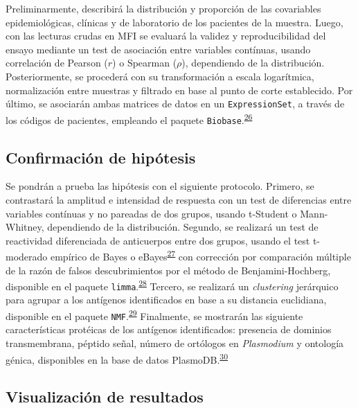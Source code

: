 \documentclass[]{article}
\begin{document}
Preliminarmente, describirá la distribución y proporción de las
covariables epidemiológicas, clínicas y de laboratorio de los pacientes
de la muestra. Luego, con las lecturas crudas en MFI se evaluará la
validez y reproducibilidad del ensayo mediante un test de asociación
entre variables contínuas, usando correlación de Pearson (\(r\)) o
Spearman (\(\rho\)), dependiendo de la distribución. Posteriormente, se
procederá con su transformación a escala logarítmica, normalización
entre muestras y filtrado en base al punto de corte establecido. Por
último, se asociarán ambas matrices de datos en un
\texttt{ExpressionSet}, a través de los códigos de pacientes, empleando
el paquete
\texttt{Biobase}.\textsuperscript{\protect\hyperlink{ref-Biobase}{26}}

\subsection{Confirmación de hipótesis}\label{confirmacion-de-hipotesis}

Se pondrán a prueba las hipótesis con el siguiente protocolo. Primero,
se contrastará la amplitud e intensidad de respuesta con un test de
diferencias entre variables contínuas y no pareadas de dos grupos,
usando t-Student o Mann-Whitney, dependiendo de la distribución.
Segundo, se realizará un test de reactividad diferenciada de anticuerpos
entre dos grupos, usando el test t-moderado empírico de Bayes o
eBayes\textsuperscript{\protect\hyperlink{ref-smyth2004ebayes}{27}} con
corrección por comparación múltiple de la razón de falsos
descubrimientos por el método de Benjamini-Hochberg, disponible en el
paquete
\texttt{limma}.\textsuperscript{\protect\hyperlink{ref-limma}{28}}
Tercero, se realizará un \emph{clustering} jerárquico para agrupar a los
antígenos identificados en base a su distancia euclidiana, disponible en
el paquete
\texttt{NMF}.\textsuperscript{\protect\hyperlink{ref-Gaujoux2010NMF}{29}}
Finalmente, se mostrarán las siguiente características protéicas de los
antígenos identificados: presencia de dominios transmembrana, péptido
señal, número de ortólogos en \emph{Plasmodium} y ontología génica,
disponibles en la base de datos
PlasmoDB.\textsuperscript{\protect\hyperlink{ref-plasmodb}{30}}

\subsection{Visualización de
resultados}\label{visualizacion-de-resultados}
\end{document}
